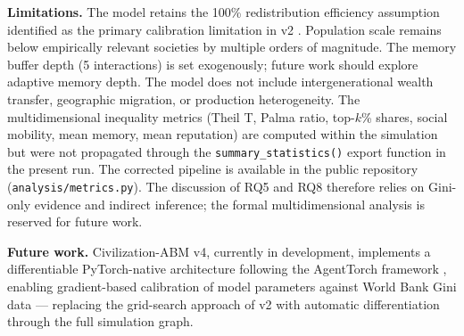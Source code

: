 \documentclass[12pt, letterpaper]{article}
\begin{document}
\noindent
\textbf{Limitations.} The model retains the 100\% redistribution
efficiency assumption identified as the primary calibration limitation
in v2 \citep{delaserna2025v2}. Population scale remains below empirically
relevant societies by multiple orders of magnitude. The memory buffer
depth (5 interactions) is set exogenously; future work should explore
adaptive memory depth. The model does not include intergenerational
wealth transfer, geographic migration, or production heterogeneity.
The multidimensional inequality metrics (Theil T, Palma ratio,
top-$k$\% shares, social mobility, mean memory, mean reputation)
are computed within the simulation but were not propagated through
the \texttt{summary\_statistics()} export function in the present run.
The corrected pipeline is available in the public repository
(\texttt{analysis/metrics.py}). The discussion of RQ5 and RQ8
therefore relies on Gini-only evidence and indirect inference;
the formal multidimensional analysis is reserved for future work.

\noindent
\textbf{Future work.} Civilization-ABM v4, currently in development,
implements a differentiable PyTorch-native architecture following the
AgentTorch framework \citep{chopra2024agenttorch}, enabling gradient-based
calibration of model parameters against World Bank Gini data --- replacing
the grid-search approach of v2 with automatic differentiation through
the full simulation graph.




\end{document}
